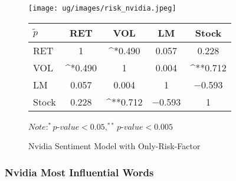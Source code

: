 \documentclass[logo,bsc,singlespacing,parskip]{infthesis}
\begin{document}
\begin{figure}[htpp]
\centering
\begin{minipage}{0.90\textwidth}
    \centering
    \texttt{[image: ug/images/risk\_nvidia.jpeg]}
    \caption{Nvidia Sentiment Model with Only-Risk-Factor}
    \label{fig:risk_nvidia}
\end{minipage}%
\hfill
\vspace{30pt} %
\begin{minipage}{0.9\textwidth}

    \begin{minipage}[t]{0.9\textwidth}
    \centering
    \begin{tabular}{lcccc}
    \label{tab:risk_nvidia_corr}
    $\tilde{p}$      & RET       & VOL       & LM        & Stock    \\ \hline
    RET    & 1  & ^{*}0.490  & 0.057 & 0.228 \\
    VOL    & ^{*}0.490   & 1  & 0.004 & ^{**}0.712  \\
    LM    & 0.057 & 0.004 & 1  & $-$0.593 \\
    Stock  & 0.228 & ^{**}0.712  & $-$0.593 & 1  \\ \hline
    \end{tabular}
    \medskip
    $\textit{Note}: ^{*}p$-$value<0.05, ^{**}p$-$value<0.005$
    \end{minipage}

\end{minipage}
\end{figure}

\subsubsection{Nvidia Most Influential Words}

\end{document}
